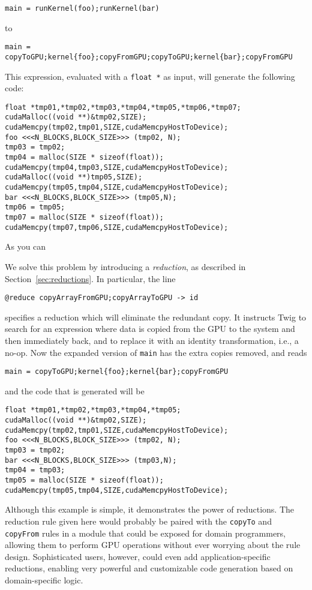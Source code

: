 \begin{verbatim}
main = runKernel(foo);runKernel(bar)
\end{verbatim}

to 

\begin{verbatim}
main = copyToGPU;kernel{foo};copyFromGPU;copyToGPU;kernel{bar};copyFromGPU
\end{verbatim}

This expression, evaluated with a \texttt{float *} as input, will generate the
following code:

\begin{verbatim}
float *tmp01,*tmp02,*tmp03,*tmp04,*tmp05,*tmp06,*tmp07;
cudaMalloc((void **)&tmp02,SIZE);
cudaMemcpy(tmp02,tmp01,SIZE,cudaMemcpyHostToDevice);
foo <<<N_BLOCKS,BLOCK_SIZE>>> (tmp02, N);
tmp03 = tmp02;
tmp04 = malloc(SIZE * sizeof(float));
cudaMemcpy(tmp04,tmp03,SIZE,cudaMemcpyHostToDevice);
cudaMalloc((void **)tmp05,SIZE);
cudaMemcpy(tmp05,tmp04,SIZE,cudaMemcpyHostToDevice);
bar <<<N_BLOCKS,BLOCK_SIZE>>> (tmp05,N);
tmp06 = tmp05;
tmp07 = malloc(SIZE * sizeof(float));
cudaMemcpy(tmp07,tmp06,SIZE,cudaMemcpyHostToDevice);
\end{verbatim}

As you can 

We solve this problem by introducing a \emph{reduction}, as described in
Section~\ref{sec:reductions}. In particular, the line

\begin{verbatim}
@reduce copyArrayFromGPU;copyArrayToGPU -> id
\end{verbatim}

specifies a reduction which will eliminate the redundant copy. It instructs Twig
to search for an expression where data is copied from the GPU to the system and
then immediately back, and to replace it with an identity transformation, i.e.,
a no-op. Now the expanded version of \texttt{main} has the extra copies removed,
and reads

\begin{verbatim}
main = copyToGPU;kernel{foo};kernel{bar};copyFromGPU
\end{verbatim}

and the code that is generated will be

\begin{verbatim}
float *tmp01,*tmp02,*tmp03,*tmp04,*tmp05;
cudaMalloc((void **)&tmp02,SIZE);
cudaMemcpy(tmp02,tmp01,SIZE,cudaMemcpyHostToDevice);
foo <<<N_BLOCKS,BLOCK_SIZE>>> (tmp02, N);
tmp03 = tmp02;
bar <<<N_BLOCKS,BLOCK_SIZE>>> (tmp03,N);
tmp04 = tmp03;
tmp05 = malloc(SIZE * sizeof(float));
cudaMemcpy(tmp05,tmp04,SIZE,cudaMemcpyHostToDevice);
\end{verbatim}

Although this example is simple, it demonstrates the power of reductions. The
reduction rule given here would probably be paired with the \texttt{copyTo} and
\texttt{copyFrom} rules in a module that could be exposed for domain
programmers, allowing them to perform GPU operations without ever worrying about
the rule design. Sophisticated users, however, could even add
application-specific reductions, enabling very powerful and customizable code
generation based on domain-specific logic.
